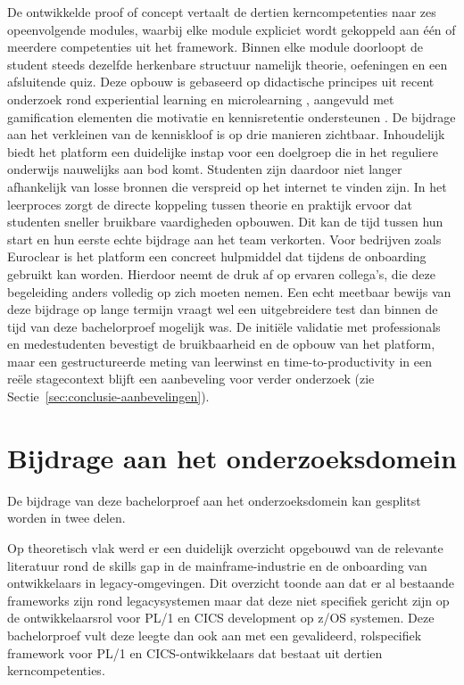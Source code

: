 De ontwikkelde proof of concept vertaalt de dertien kerncompetenties naar zes opeenvolgende modules, waarbij elke module expliciet wordt gekoppeld aan één of meerdere competenties uit het framework.
Binnen elke module doorloopt de student steeds dezelfde herkenbare structuur namelijk theorie, oefeningen en een afsluitende quiz.
Deze opbouw is gebaseerd op didactische principes uit recent onderzoek rond experiential learning \autocite{holmes2018dimensions} en microlearning \autocite{granatella}, aangevuld met gamification elementen die motivatie en kennisretentie ondersteunen \autocite{dinardo2024usage}.
De bijdrage aan het verkleinen van de kenniskloof is op drie manieren zichtbaar.
Inhoudelijk biedt het platform een duidelijke instap voor een doelgroep die in het reguliere onderwijs nauwelijks aan bod komt. 
Studenten zijn daardoor niet langer afhankelijk van losse bronnen die verspreid op het internet te vinden zijn.
In het leerproces zorgt de directe koppeling tussen theorie en praktijk ervoor dat studenten sneller bruikbare vaardigheden opbouwen.
Dit kan de tijd tussen hun start en hun eerste echte bijdrage aan het team verkorten.
Voor bedrijven zoals Euroclear is het platform een concreet hulpmiddel dat tijdens de onboarding gebruikt kan worden.
Hierdoor neemt de druk af op ervaren collega's, die deze begeleiding anders volledig op zich moeten nemen.
Een echt meetbaar bewijs van deze bijdrage op lange termijn vraagt wel een uitgebreidere test dan binnen de tijd van deze bachelorproef mogelijk was.
De initiële validatie met professionals en medestudenten bevestigt de bruikbaarheid en de opbouw van het platform, maar een gestructureerde meting van leerwinst en time-to-productivity in een reële stagecontext blijft een aanbeveling voor verder onderzoek (zie Sectie~\ref{sec:conclusie-aanbevelingen}).

\section{Bijdrage aan het onderzoeksdomein}%
\label{sec:conclusie-bijdrage}

De bijdrage van deze bachelorproef aan het onderzoeksdomein kan gesplitst worden in twee delen.

Op theoretisch vlak werd er een duidelijk overzicht opgebouwd van de relevante literatuur rond de skills gap in de mainframe-industrie en de onboarding van ontwikkelaars in legacy-omgevingen.
Dit overzicht toonde aan dat er al bestaande frameworks zijn rond legacysystemen maar dat deze niet specifiek gericht zijn op de ontwikkelaarsrol voor PL/1 en CICS development op z/OS systemen.
Deze bachelorproef vult deze leegte dan ook aan met een gevalideerd, rolspecifiek framework voor PL/1 en CICS-ontwikkelaars dat bestaat uit dertien kerncompetenties.

